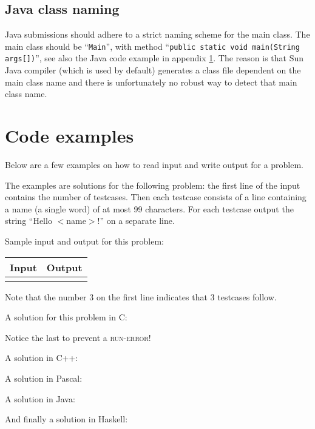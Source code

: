 \subsection{Java class naming}

Java submissions should adhere to a strict naming scheme for the main
class. The main class should be ``\verb!Main!'', with method
``\verb!public static void main(String args[])!'', see also the Java
code example in appendix \ref{codeexamples}. The reason is that Sun
Java compiler (which is used by default) generates a class file
dependent on the main class name and there is unfortunately no robust
way to detect that main class name.

\newpage
\appendix

\section{Code examples}\label{codeexamples}

Below are a few examples on how to read input and write output for a
problem.

The examples are solutions for the following problem: the first line
of the input contains the number of testcases. Then each testcase
consists of a line containing a name (a single word) of at most 99
characters. For each testcase output the string ``Hello $<$name$>$!''
on a separate line.

Sample input and output for this problem:

\begin{tabular}{|p{}|p{}|}
\hline
\textbf{Input} & \textbf{Output} \\
\hline
 &
 \\
\hline
\end{tabular}

Note that the number 3 on the first line indicates that 3 testcases
follow.

A solution for this problem in C:

Notice the last  to prevent a \textsc{run-error}!

\newpage

A solution in C++:

A solution in Pascal:

\newpage

A solution in Java:

And finally a solution in Haskell:


